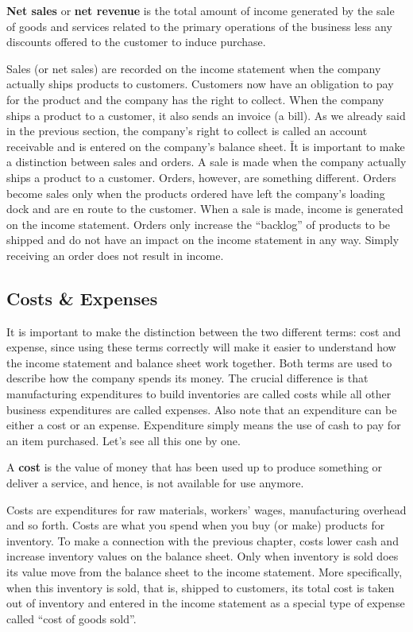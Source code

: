 \textbf{Net sales} or \textbf{net revenue} is the total amount of income generated by the sale of goods and services
related to the primary operations of the business less any discounts offered to the customer to induce purchase.
\ed

Sales (or net sales) are recorded on the income statement when the company actually ships products to customers.
Customers now have an obligation to pay for the product and the company has the right to collect. When the company
ships a product to a customer, it also sends an invoice (a bill). As we already said in the previous section, the
company's right to collect is called an account receivable and is entered on the company's balance sheet. \v

It is important to make a distinction between sales and orders. A sale is made when the company actually ships a
product to a customer. Orders, however, are something different. Orders become sales only when the products ordered
have left the company's loading dock and are en route to the customer. When a sale is made, income is generated on
the income statement. Orders only increase the ``backlog'' of products to be shipped and do not have an impact on the
income statement in any way. Simply receiving an order does not result in income.

\subsection{Costs \& Expenses}

It is important to make the distinction between the two different terms: cost and expense, since using these terms
correctly will make it easier to understand how the income statement and balance sheet work together. Both terms are
used to describe how the company spends its money. The crucial difference is that manufacturing expenditures to build
inventories are called costs while all other business expenditures are called expenses. Also note that an expenditure
can be either a cost or an expense. Expenditure simply means the use of cash to pay for an item purchased. Let's see
all this one by one.

\bd[Cost]
A \textbf{cost} is the value of money that has been used up to produce something or deliver a service, and hence, is not
available for use anymore.
\ed

Costs are expenditures for raw materials, workers' wages, manufacturing overhead and so forth. Costs are what you
spend when you buy (or make) products for inventory. To make a connection with the previous chapter, costs lower cash
and increase inventory values on the balance sheet. Only when inventory is sold does its value move from the balance
sheet to the income statement. More specifically, when this inventory is sold, that is, shipped to customers, its
total cost is taken out of inventory and entered in the income statement as a special type of expense called ``cost
of goods sold''.

